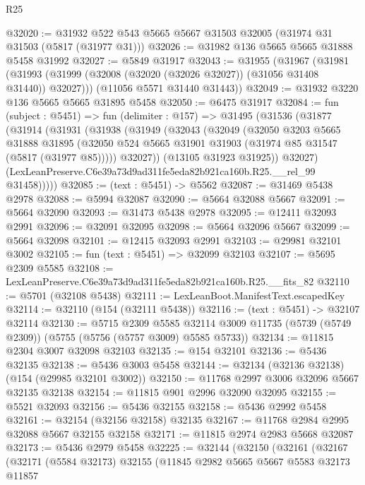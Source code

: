 \begin{lexlean}{R25}
\begin{coremodule}
@32020 := @31932 @522 @543 @5665 @5667 @31503 @32005 (@31974 @31 @31503 (@5817 (@31977 @31)))
@32026 := @31982 @136 @5665 @5665 @31888 @5458 @31992
@32027 := @5849 @31917
@32043 := @31955
    (@31967
      (@31981 (@31993 (@31999 (@32008 (@32020 (@32026 @32027)) (@31056 @31408 @31440)) @32027)))
      (@11056 @5571 @31440 @31443))
@32049 := @31932 @3220 @136 @5665 @5665 @31895 @5458
@32050 := @6475 @31917
@32084 := fun (subject : @5451) =>
  fun (delimiter : @157) =>
  @31495
    (@31536
      (@31877
        (@31914
          (@31931
            (@31938
              (@31949
                (@32043
                  (@32049
                    (@32050
                      @3203
                      @5665
                      @31888
                      @31895
                      (@32050 @524 @5665 @31901 @31903 (@31974 @85 @31547 (@5817 (@31977 @85)))))
                    @32027))
                (@13105 @31923 @31925))
              @32027)
            (LexLeanPreserve.C6e39a73d9ad311fe5eda82b921ca160b.R25.__rel_99 @31458)))))
@32085 := (text : @5451) -> @5562
@32087 := @31469 @5438 @2978
@32088 := @5994 @32087
@32090 := @5664 @32088 @5667
@32091 := @5664 @32090
@32093 := @31473 @5438 @2978
@32095 := @12411 @32093 @2991
@32096 := @32091 @32095
@32098 := @5664 @32096 @5667
@32099 := @5664 @32098
@32101 := @12415 @32093 @2991
@32103 := @29981 @32101 @3002
@32105 := fun (text : @5451) => @32099 @32103
@32107 := @5695 @2309 @5585
@32108 := LexLeanPreserve.C6e39a73d9ad311fe5eda82b921ca160b.R25.__fits_82
@32110 := @5701 (@32108 @5438)
@32111 := LexLeanBoot.ManifestText.escapedKey
@32114 := @32110 (@154 (@32111 @5438))
@32116 := (text : @5451) -> @32107 @32114
@32130 := @5715
    @2309
    @5585
    @32114
    @3009
    @11735
    (@5739 (@5749 @2309))
    (@5755 (@5756 (@5757 @3009) @5585 @5733))
@32134 := @11815 @2304 @3007 @32098 @32103
@32135 := @154 @32101
@32136 := @5436 @32135
@32138 := @5436 @3003 @5458
@32144 := @32134 (@32136 @32138) (@154 (@29985 @32101 @3002))
@32150 := @11768 @2997 @3006 @32096 @5667 @32135 @32138
@32154 := @11815 @901 @2996 @32090 @32095
@32155 := @5521 @32093
@32156 := @5436 @32155
@32158 := @5436 @2992 @5458
@32161 := @32154 (@32156 @32158) @32135
@32167 := @11768 @2984 @2995 @32088 @5667 @32155 @32158
@32171 := @11815 @2974 @2983 @5668 @32087
@32173 := @5436 @2979 @5458
@32225 := @32144
    (@32150
      (@32161
        (@32167
          (@32171
            (@5584 @32173)
            @32155
            (@11845
              @2982
              @5665
              @5667
              @5583
              @32173
              @11857

\end{coremodule}
\end{lexlean}
